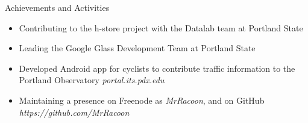 \documentclass[11pt,oneside]{article}
\newenvironment{ressection}[1]{
    \vspace{4pt}
    {\fontfamily{phv}\selectfont\Large#1}
    \begin{itemize}
    \vspace{3pt}
}{
    \end{itemize}
}
\newcommand{\resitem}[1]{
    \vspace{-4pt}
    \item \begin{flushleft} #1 \end{flushleft}
}
\begin{document}
\begin{ressection}{Achievements and Activities}
    \resitem{Contributing to the h-store project with the Datalab team at Portland State}
    \resitem{Leading the Google Glass Development Team at Portland State}
    \resitem{Developed Android app for cyclists to contribute traffic information to the Portland Observatory \textit{portal.its.pdx.edu}}
    \resitem{Maintaining a presence on Freenode as \textit{MrRacoon}, and on GitHub \textit{https://github.com/MrRacoon}}
\end{ressection}
\end{document}
